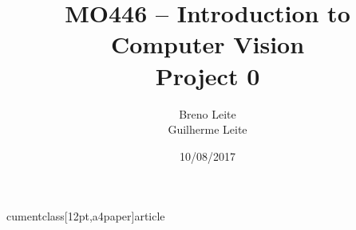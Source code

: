 
cumentclass[12pt,a4paper]{article}
\usepackage[utf8]{inputenc} %
\usepackage[T1]{fontenc}
\usepackage[brazil]{babel}

\usepackage[left=2.5cm,right=2cm,top=2cm,bottom=2.5cm]{geometry}
\usepackage{amsmath}
\usepackage{amsthm}
\usepackage{amsfonts}
\usepackage{graphicx}
\usepackage{algorithm}
\usepackage{color}
\usepackage[noend]{algpseudocode}
\usepackage{mathtools}

\usepackage{mathptmx}
\usepackage[scaled=.90]{helvet}
\usepackage{courier}

\newcommand{\mdc}[1]{\mathrm{mdc}(#1)}

\DeclarePairedDelimiter\ceil{\lceil}{\rceil}
\DeclarePairedDelimiter\floor{\lfloor}{\rfloor}



\title{MO446 -- Introduction to Computer Vision  \\ Project 0}
\author{Breno Leite  \\ Guilherme Leite}
\date{10/08/2017}



\maketitle

